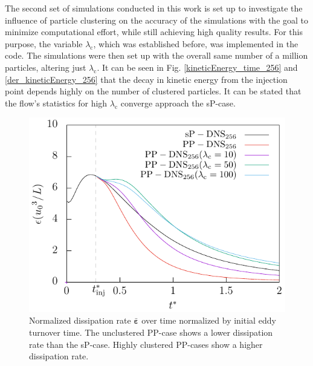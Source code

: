 \documentclass[11pt,a4paper,openany,oneside,parskip=half*]{article}
\renewcommand*\vec[1]{\boldsymbol{#1}}
\begin{document}
\newline
The second set of simulations conducted in this work is set up to investigate the influence of particle clustering on the accuracy of the simulations with the goal to minimize computational effort, while still achieving high quality results. For this purpose, the variable $\lambda_\mathrm{c}$, which was established before, was implemented in the code. The simulations were then set up with the overall same number of a million particles, altering just $\lambda_\mathrm{c}$. It can be seen in Fig. \ref{kineticEnergy_time_256} and \ref{der_kineticEnergy_256} that the decay in kinetic energy from the injection point depends highly on the number of clustered particles. It can be stated that the flow's statistics for high $\lambda_\mathrm{c}$ converge approach the sP-case. 
\begin{figure}[h]
    \centering
    \begin{minipage}[t]{0.5\textwidth}
         \centering
        \includegraphics[width=\linewidth]{./Abbildungen/256/diss_time.pdf}
        \caption{Normalized dissipation rate $\bar{\vec{\varepsilon}}$ over time normalized by initial eddy turnover time. The unclustered PP-case shows a lower dissipation rate than the sP-case. Highly clustered PP-cases show a higher dissipation rate.}
        \label{diss_time_256}
    \end{minipage}%
    \begin{minipage}[t]{0.5\textwidth}
        \centering

\end{minipage}
\end{figure}
\end{document}
